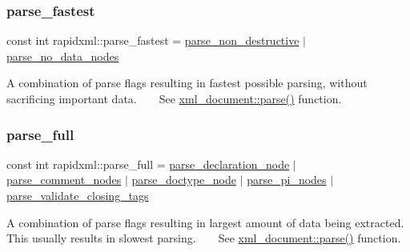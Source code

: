 \subsubsection{\texorpdfstring{parse\+\_\+fastest}{parse\_fastest}}
{\footnotesize\ttfamily const int rapidxml\+::parse\+\_\+fastest = \mbox{\hyperlink{namespacerapidxml_a45d4d8fef551beaaba23a83b847fd6a3}{parse\+\_\+non\+\_\+destructive}} $\vert$ \mbox{\hyperlink{namespacerapidxml_ac2d21ef14a4e8936b94aca5d38b1a74d}{parse\+\_\+no\+\_\+data\+\_\+nodes}}}

A combination of parse flags resulting in fastest possible parsing, without sacrificing important data. ~\newline
~\newline
 See \mbox{\hyperlink{classrapidxml_1_1xml__document_ac6e73ff9ac323bf5a370c38feb03a6b1}{xml\+\_\+document\+::parse()}} function. \mbox{\label{namespacerapidxml_abb48dc65db75d9e49734bc5bd2fabbfc}} 
\subsubsection{\texorpdfstring{parse\+\_\+full}{parse\_full}}
{\footnotesize\ttfamily const int rapidxml\+::parse\+\_\+full = \mbox{\hyperlink{namespacerapidxml_a999d782659513f8015ea4236e3204c42}{parse\+\_\+declaration\+\_\+node}} $\vert$ \mbox{\hyperlink{namespacerapidxml_ae093dd49e2f59fa39eee95f1a6568e32}{parse\+\_\+comment\+\_\+nodes}} $\vert$ \mbox{\hyperlink{namespacerapidxml_a41002b49780a90a0bbcc28ce8b895fe4}{parse\+\_\+doctype\+\_\+node}} $\vert$ \mbox{\hyperlink{namespacerapidxml_a03fe68fcf5d28f38476e0fd31adecc4c}{parse\+\_\+pi\+\_\+nodes}} $\vert$ \mbox{\hyperlink{namespacerapidxml_a7ce8f40fda68338e20b56f41e48e49f3}{parse\+\_\+validate\+\_\+closing\+\_\+tags}}}

A combination of parse flags resulting in largest amount of data being extracted. This usually results in slowest parsing. ~\newline
~\newline
 See \mbox{\hyperlink{classrapidxml_1_1xml__document_ac6e73ff9ac323bf5a370c38feb03a6b1}{xml\+\_\+document\+::parse()}} function. \mbox{\label{namespacerapidxml_ac2d21ef14a4e8936b94aca5d38b1a74d}} 
